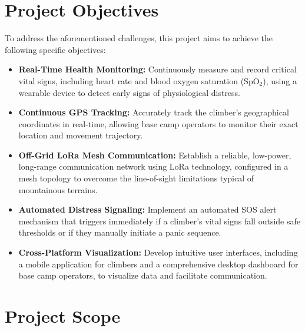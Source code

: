 \section{Project Objectives}
To address the aforementioned challenges, this project aims to achieve the following specific objectives:
\begin{itemize}
    \item \textbf{Real-Time Health Monitoring:} Continuously measure and record critical vital signs, including heart rate and blood oxygen saturation (SpO$_2$), using a wearable device to detect early signs of physiological distress.
    \item \textbf{Continuous GPS Tracking:} Accurately track the climber's geographical coordinates in real-time, allowing base camp operators to monitor their exact location and movement trajectory.
    \item \textbf{Off-Grid LoRa Mesh Communication:} Establish a reliable, low-power, long-range communication network using LoRa technology, configured in a mesh topology to overcome the line-of-sight limitations typical of mountainous terrains.
    \item \textbf{Automated Distress Signaling:} Implement an automated SOS alert mechanism that triggers immediately if a climber's vital signs fall outside safe thresholds or if they manually initiate a panic sequence.
    \item \textbf{Cross-Platform Visualization:} Develop intuitive user interfaces, including a mobile application for climbers and a comprehensive desktop dashboard for base camp operators, to visualize data and facilitate communication.
\end{itemize}

\section{Project Scope}
